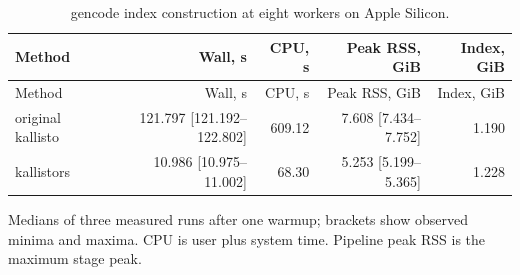 \begingroup
\small
\setlength{\tabcolsep}{4pt}
\begin{longtable}{@{}lrrrr@{}}
\caption{gencode index construction at eight workers on Apple Silicon.}\label{tab:paper-index-gencode}\\
\toprule
Method & Wall, s & CPU, s & Peak RSS, GiB & Index, GiB \\
\midrule
\endfirsthead
\toprule
Method & Wall, s & CPU, s & Peak RSS, GiB & Index, GiB \\
\midrule
\endhead
\bottomrule
\endfoot
original kallisto & 121.797 [121.192--122.802] & 609.12 & 7.608 [7.434--7.752] & 1.190 \\
kallistors & 10.986 [10.975--11.002] & 68.30 & 5.253 [5.199--5.365] & 1.228 \\
\end{longtable}
\noindent\footnotesize Medians of three measured runs after one warmup; brackets show observed minima and maxima. CPU is user plus system time. Pipeline peak RSS is the maximum stage peak.
\endgroup
